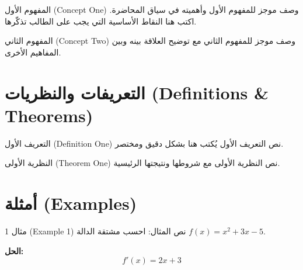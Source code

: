 \documentclass[11pt,a4paper]{article}
\newcommand{\sectiondivider}{%
  \par\noindent{\color{accent}\rule{\linewidth}{0.8pt}}\par\vspace{0.4em}%
}
\begin{document}
\begin{conceptbox}{المفهوم الأول (Concept One)}
وصف موجز للمفهوم الأول وأهميته في سياق المحاضرة. اكتب هنا النقاط الأساسية
التي يجب على الطالب تذكّرها.
\end{conceptbox}

\vspace{0.5em}

\begin{conceptbox}{المفهوم الثاني (Concept Two)}
وصف موجز للمفهوم الثاني مع توضيح العلاقة بينه وبين المفاهيم الأخرى.
\end{conceptbox}

\section{التعريفات والنظريات (Definitions \& Theorems)}
\sectiondivider

\begin{definitionbox}{التعريف الأول (Definition One)}
نص التعريف الأول يُكتب هنا بشكل دقيق ومختصر.
\end{definitionbox}

\vspace{0.5em}

\begin{theoremtbox}{النظرية الأولى (Theorem One)}
نص النظرية الأولى مع شروطها ونتيجتها الرئيسية.
\end{theoremtbox}

\section{أمثلة (Examples)}
\sectiondivider

\begin{examplebox}{مثال 1 (Example 1)}
نص المثال: احسب مشتقة الدالة $f(x) = x^{2} + 3x - 5$.

\textbf{الحل:}
\[
f'(x) = 2x + 3
\]
\end{examplebox}

\vspace{0.5em}
\end{document}
